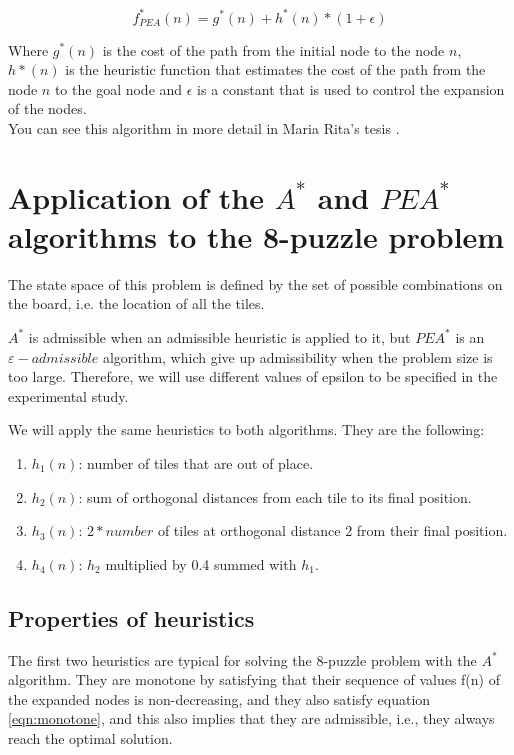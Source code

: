 \documentclass[runningheads]{llncs}
\begin{document}
\begin{equation}\label{eqn:pea*}
f_{PEA}^*(n) = g^*(n) + h^*(n) * (1 + \epsilon)
\end{equation}

Where \(g^*(n)\) is the cost of the path from the initial node to the node \(n\), 
\(h*(n)\) is the heuristic function that estimates the cost of the path from the node \(n\) to the goal node and 
\(\epsilon\) is a constant that is used to control the expansion of the nodes.\\
You can see this algorithm in more detail in Maria Rita's tesis \cite{algorithms_5}.

\section{Application of the $A^*$ and \(PEA^*\) algorithms to the 8-puzzle problem}
The state space of this problem is defined by the set of possible combinations on the board,
 i.e. the location of all the tiles.

$A^*$ is admissible when an admissible heuristic is applied to it, but 
$PEA^*$ is an $\varepsilon-admissible$ algorithm, which give up 
admissibility when the problem size is too large. Therefore, we will use 
different values of epsilon to be specified in the experimental study.

We will apply the same heuristics to both algorithms. They are the following:
\begin{enumerate}
    \item $h_1(n)$: number of tiles that are out of place.
    \item $h_2(n)$: sum of orthogonal distances from each tile to its final position.
    \item $h_3(n)$: $2*number$ of tiles at orthogonal distance 2 from their final position.
    \item $h_4(n)$: $h_2$ multiplied by 0.4 summed with $h_1$.
\end{enumerate}
\subsection{Properties of heuristics}
The first two heuristics are typical for solving the 8-puzzle problem with 
the $A^*$ algorithm. They are monotone by satisfying that their sequence of 
values f(n) of the expanded nodes is non-decreasing, and they also satisfy equation 
\ref{eqn:monotone}, and this also implies that they are admissible, 
i.e., they always reach the optimal solution.
\end{document}

